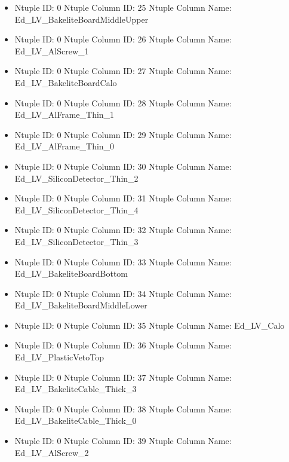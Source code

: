 \documentclass[8pt]{beamer}
\begin{document}
\begin{frame}
\begin{itemize}
        \item Ntuple ID: 0 Ntuple Column ID: 25 Ntuple Column Name: Ed\_LV\_BakeliteBoardMiddleUpper
        
        \item Ntuple ID: 0 Ntuple Column ID: 26 Ntuple Column Name: Ed\_LV\_AlScrew\_1
        
        \item Ntuple ID: 0 Ntuple Column ID: 27 Ntuple Column Name: Ed\_LV\_BakeliteBoardCalo
        
        \item Ntuple ID: 0 Ntuple Column ID: 28 Ntuple Column Name: Ed\_LV\_AlFrame\_Thin\_1
        
        \item Ntuple ID: 0 Ntuple Column ID: 29 Ntuple Column Name: Ed\_LV\_AlFrame\_Thin\_0
        
        \item Ntuple ID: 0 Ntuple Column ID: 30 Ntuple Column Name: Ed\_LV\_SiliconDetector\_Thin\_2
        
        \item Ntuple ID: 0 Ntuple Column ID: 31 Ntuple Column Name: Ed\_LV\_SiliconDetector\_Thin\_4
        
        \item Ntuple ID: 0 Ntuple Column ID: 32 Ntuple Column Name: Ed\_LV\_SiliconDetector\_Thin\_3
        
        \item Ntuple ID: 0 Ntuple Column ID: 33 Ntuple Column Name: Ed\_LV\_BakeliteBoardBottom
        
        \item Ntuple ID: 0 Ntuple Column ID: 34 Ntuple Column Name: Ed\_LV\_BakeliteBoardMiddleLower
        
        \item Ntuple ID: 0 Ntuple Column ID: 35 Ntuple Column Name: Ed\_LV\_Calo
        
        \item Ntuple ID: 0 Ntuple Column ID: 36 Ntuple Column Name: Ed\_LV\_PlasticVetoTop
        
        \item Ntuple ID: 0 Ntuple Column ID: 37 Ntuple Column Name: Ed\_LV\_BakeliteCable\_Thick\_3
        
        \item Ntuple ID: 0 Ntuple Column ID: 38 Ntuple Column Name: Ed\_LV\_BakeliteCable\_Thick\_0
        
        \item Ntuple ID: 0 Ntuple Column ID: 39 Ntuple Column Name: Ed\_LV\_AlScrew\_2
        

\end{itemize}
\end{frame}
\end{document}
